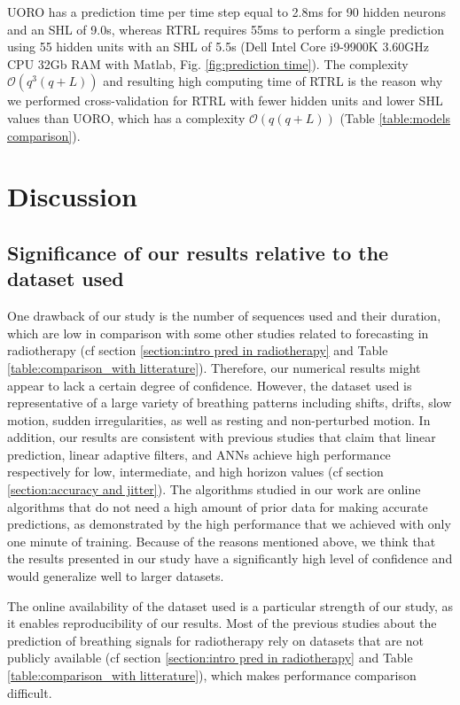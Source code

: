 \documentclass[twocolumn,a4paper]{svjour3} \sloppy          \smartqed
\begin{document}
UORO has a prediction time per time step equal to 2.8ms for 90 hidden neurons and an SHL of 9.0s, whereas RTRL requires 55ms to perform a single prediction using 55 hidden units with an SHL of 5.5s (Dell Intel Core i9-9900K 3.60GHz CPU 32Gb RAM with Matlab, Fig. \ref{fig:prediction time}). The complexity $\mathcal{O}(q^3 (q+L))$ and resulting high computing time of RTRL is the reason why we performed cross-validation for RTRL with fewer hidden units and lower SHL values than UORO, which has a complexity $\mathcal{O}(q(q+L))$ (Table \ref{table:models comparison}).


\section{Discussion}

\subsection{Significance of our results relative to the dataset used}
\label{section: comments on dataset}

One drawback of our study is the number of sequences used and their duration, which are low in comparison with some other studies related to forecasting in radiotherapy (cf section \ref{section:intro pred in radiotherapy} and Table \ref{table:comparison_with litterature}). Therefore, our numerical results might appear to lack a certain degree of confidence. However, the dataset used is representative of a large variety of breathing patterns including shifts, drifts, slow motion, sudden irregularities, as well as resting and non-perturbed motion. In addition, our results are consistent with previous studies that claim that linear prediction, linear adaptive filters, and ANNs achieve high performance respectively for low, intermediate, and high horizon values (cf section \ref{section:accuracy and jitter}). The algorithms studied in our work are online algorithms that do not need a high amount of prior data for making accurate predictions, as demonstrated by the high performance that we achieved with only one minute of training. Because of the reasons mentioned above, we think that the results presented in our study have a significantly high level of confidence and would generalize well to larger datasets.

The online availability of the dataset used is a particular strength of our study, as it enables reproducibility of our results. Most of the previous studies about the prediction of breathing signals for radiotherapy rely on datasets that are not publicly available (cf section \ref{section:intro pred in radiotherapy} and Table \ref{table:comparison_with litterature}), which makes performance comparison difficult.
\end{document}
